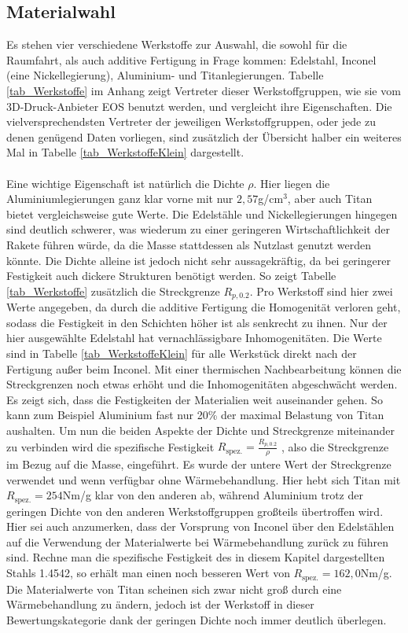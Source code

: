 \subsection{Materialwahl}
Es stehen vier verschiedene Werkstoffe zur Auswahl, die sowohl für die Raumfahrt, als auch additive Fertigung in Frage kommen: Edelstahl, Inconel (eine Nickellegierung), Aluminium- und Titanlegierungen. Tabelle \ref{tab_Werkstoffe} im Anhang zeigt Vertreter dieser Werkstoffgruppen, wie sie vom 3D-Druck-Anbieter EOS benutzt werden, und vergleicht ihre Eigenschaften. Die vielversprechendsten Vertreter der jeweiligen Werkstoffgruppen, oder jede zu denen genügend Daten vorliegen, sind zusätzlich der Übersicht halber ein weiteres Mal in Tabelle \ref{tab_WerkstoffeKlein} dargestellt.
\\~\\
Eine wichtige Eigenschaft ist natürlich die Dichte $\rho$. Hier liegen die Aluminiumlegierungen ganz klar vorne mit nur $2,57$g/cm$^3$, aber auch Titan bietet vergleichsweise gute Werte. Die Edelstähle und Nickellegierungen hingegen sind deutlich schwerer, was wiederum zu einer geringeren Wirtschaftlichkeit der Rakete führen würde, da die Masse stattdessen als Nutzlast genutzt werden könnte. Die Dichte alleine ist jedoch nicht sehr aussagekräftig, da bei geringerer Festigkeit auch dickere Strukturen benötigt werden. So zeigt Tabelle \ref{tab_Werkstoffe} zusätzlich die Streckgrenze $R_{p,0.2}$. Pro Werkstoff sind hier zwei Werte angegeben, da durch die additive Fertigung die Homogenität verloren geht, sodass die Festigkeit in den Schichten höher ist als senkrecht zu ihnen. Nur der hier ausgewählte Edelstahl hat vernachlässigbare Inhomogenitäten. Die Werte sind in Tabelle \ref{tab_WerkstoffeKlein} für alle Werkstück direkt nach der Fertigung außer beim Inconel. Mit einer thermischen Nachbearbeitung können die Streckgrenzen noch etwas erhöht und die Inhomogenitäten abgeschwächt werden. Es zeigt sich, dass die Festigkeiten der Materialien weit auseinander gehen. So kann zum Beispiel Aluminium fast nur 20\% der maximal Belastung von Titan aushalten. Um nun die beiden Aspekte der Dichte und Streckgrenze miteinander zu verbinden wird die spezifische Festigkeit $R_\mathrm{spez.}=\frac{R_{p,0.2}}{\rho}$ , also die Streckgrenze im Bezug auf die Masse, eingeführt. Es wurde der untere Wert der Streckgrenze verwendet und wenn verfügbar ohne Wärmebehandlung. Hier hebt sich Titan mit $R_\mathrm{spez.}=254$Nm/g klar von den anderen ab, während Aluminium trotz der geringen Dichte von den anderen Werkstoffgruppen großteils übertroffen wird. Hier sei auch anzumerken, dass der Vorsprung von Inconel über den Edelstählen auf die Verwendung der Materialwerte bei Wärmebehandlung zurück zu führen sind. Rechne man die spezifische Festigkeit des in diesem Kapitel dargestellten Stahls 1.4542, so erhält man einen noch besseren Wert von $R_\mathrm{spez.} = 162,0$Nm/g. Die Materialwerte von Titan scheinen sich zwar nicht groß durch eine Wärmebehandlung zu ändern, jedoch ist der Werkstoff in dieser Bewertungskategorie dank der geringen Dichte noch immer deutlich überlegen.
